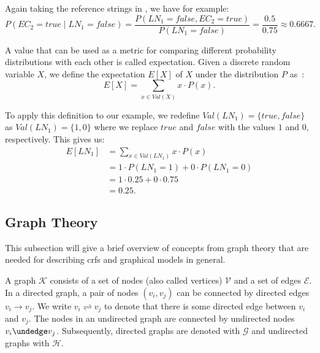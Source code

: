 Again taking the reference strings in , we have for example:
\begin{equation*}
  P(EC_2{=}\mathit{true}\mid LN_1{=}\mathit{false})=\frac{P(LN_1{=}\mathit{false}, EC_2{=}\mathit{true})}{P(LN_1{=}\mathit{false})}=\frac{0.5}{0.75}\approx0.6667.
\end{equation*}

\bigskip

A value that can be used as a metric for comparing different \glspl{probability distribution} with each other is called \gls{expectation}.
Given a discrete \gls{random variable} $X$, we define the expectation $E[X]$ of $X$ under the distribution $P$ as~\cite{koller2009probabilistic}:
\begin{equation}
  \label{equ:expectation-x}
  E[X]=\sum_{x\in \mathit{Val}(X)} x\cdot P(x).
\end{equation}

To apply this definition to our example, we redefine $\mathit{Val}(LN_1)=\{\mathit{true},\mathit{false}\}$ as $\mathit{Val}(LN_1)=\{1,0\}$ where we replace $\mathit{true}$ and $\mathit{false}$ with the values $1$ and $0$, respectively.
This gives us:
\begin{equation*}
  \begin{split}
  \label{equ:expectation-x}
  E[LN_1]&=\sum_{x\in \mathit{Val}(LN_1)} x\cdot P(x)\\
  &=1\cdot P(LN_1{=}1)+0\cdot P(LN_1{=}0)\\
  &=1\cdot 0.25+0\cdot 0.75\\
  &=0.25.
  \end{split}
\end{equation*}

\subsection{Graph Theory}\label{subsec:graph-theory}

This subsection will give a brief overview of concepts from graph theory that are needed for describing \glspl{crf} and graphical models in general.

\bigskip

A \gls{graph} $\mathcal{K}$ consists of a set of \glspl{node} (also called vertices) $\mathcal{V}$ and a set of \glspl{edge} $\mathcal{E}$.
In a directed \gls{graph}, a pair of \glspl{node} $(v_i,v_j)$ can be connected by directed \glspl{edge} $v_i\to v_j$.
We write $v_i\rightleftharpoons v_j$ to denote that there is some directed edge between $v_i$ and $v_j$.
The \glspl{node} in an undirected graph are connected by undirected \glspl{node} $v_i\undedge v_j$.
Subsequently, directed \glspl{graph} are denoted with $\mathcal{G}$ and undirected \glspl{graph} with $\mathcal{H}$.

